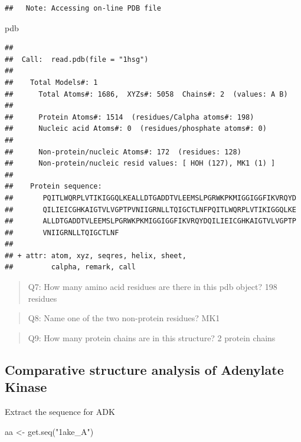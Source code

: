 \documentclass[
]{article}
\newenvironment{Shaded}{\begin{snugshade}}{\end{snugshade}}
\newcommand{\FunctionTok}[1]{\textcolor[rgb]{0.00,0.00,0.00}{#1}}
\newcommand{\NormalTok}[1]{#1}
\newcommand{\OtherTok}[1]{\textcolor[rgb]{0.56,0.35,0.01}{#1}}
\newcommand{\StringTok}[1]{\textcolor[rgb]{0.31,0.60,0.02}{#1}}
\begin{document}
\begin{verbatim}
##   Note: Accessing on-line PDB file
\end{verbatim}

\begin{Shaded}
\begin{Highlighting}[]
\NormalTok{pdb}
\end{Highlighting}
\end{Shaded}

\begin{verbatim}
## 
##  Call:  read.pdb(file = "1hsg")
## 
##    Total Models#: 1
##      Total Atoms#: 1686,  XYZs#: 5058  Chains#: 2  (values: A B)
## 
##      Protein Atoms#: 1514  (residues/Calpha atoms#: 198)
##      Nucleic acid Atoms#: 0  (residues/phosphate atoms#: 0)
## 
##      Non-protein/nucleic Atoms#: 172  (residues: 128)
##      Non-protein/nucleic resid values: [ HOH (127), MK1 (1) ]
## 
##    Protein sequence:
##       PQITLWQRPLVTIKIGGQLKEALLDTGADDTVLEEMSLPGRWKPKMIGGIGGFIKVRQYD
##       QILIEICGHKAIGTVLVGPTPVNIIGRNLLTQIGCTLNFPQITLWQRPLVTIKIGGQLKE
##       ALLDTGADDTVLEEMSLPGRWKPKMIGGIGGFIKVRQYDQILIEICGHKAIGTVLVGPTP
##       VNIIGRNLLTQIGCTLNF
## 
## + attr: atom, xyz, seqres, helix, sheet,
##         calpha, remark, call
\end{verbatim}

\begin{quote}
Q7: How many amino acid residues are there in this pdb object? 198
residues
\end{quote}

\begin{quote}
Q8: Name one of the two non-protein residues? MK1
\end{quote}

\begin{quote}
Q9: How many protein chains are in this structure? 2 protein chains
\end{quote}

\hypertarget{comparative-structure-analysis-of-adenylate-kinase}{%
\subsection{Comparative structure analysis of Adenylate
Kinase}\label{comparative-structure-analysis-of-adenylate-kinase}}

Extract the sequence for ADK

\begin{Shaded}
\begin{Highlighting}[]
\NormalTok{aa }\OtherTok{\textless{}{-}} \FunctionTok{get.seq}\NormalTok{(}\StringTok{"1ake\_A"}\NormalTok{)}
\end{Highlighting}
\end{Shaded}
\end{document}
